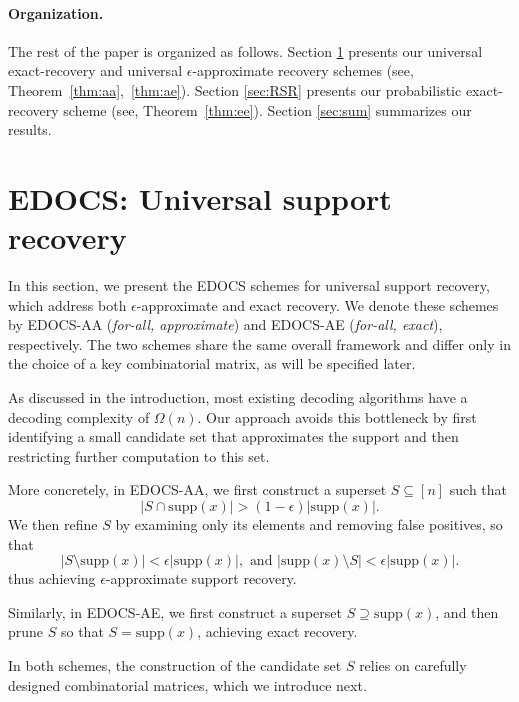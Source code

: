 \documentclass{article}
\newcommand{\supp}{\mathrm{supp}}
\begin{document}

\paragraph{Organization.} The rest of the paper is organized as follows. Section \ref{sec:USR} presents our universal exact-recovery and universal $\epsilon$-approximate recovery schemes (see, Theorem~\ref{thm:aa},~\ref{thm:ae}). Section \ref{sec:RSR} presents our probabilistic exact-recovery scheme (see, Theorem~\ref{thm:ee}). Section \ref{sec:sum} summarizes our results. 

\section{EDOCS: Universal support recovery}\label{sec:USR}
In this section, we present the \textsc{EDOCS} schemes for universal support recovery, which address both $\epsilon$-approximate and exact recovery. We denote these schemes by \textsc{EDOCS-AA} (\emph{for-all, approximate}) and \textsc{EDOCS-AE} (\emph{for-all, exact}), respectively. The two schemes share the same overall framework and differ only in the choice of a key combinatorial matrix, as will be specified later.

As discussed in the introduction, most existing decoding algorithms have a decoding complexity of $\Omega(n)$. Our approach avoids this bottleneck by first identifying a small candidate set that approximates the support and then restricting further computation to this set.

More concretely, in \textsc{EDOCS-AA}, we first construct a superset $S \subseteq [n]$ such that
\[
|S \cap \supp(x)| > (1-\epsilon)|\supp(x)|.
\]
We then refine $S$ by examining only its elements and removing false positives, so that
\[
|S \setminus \supp(x)| < \epsilon |\supp(x)|, \text{ and }
|\supp(x) \setminus S| < \epsilon |\supp(x)|.
\]
thus achieving $\epsilon$-approximate support recovery.

Similarly, in \textsc{EDOCS-AE}, we first construct a superset $S \supseteq \supp(x)$, and then prune $S$ so that $S = \supp(x)$, achieving exact recovery.

In both schemes, the construction of the candidate set $S$ relies on carefully designed combinatorial matrices, which we introduce next.
\end{document}
